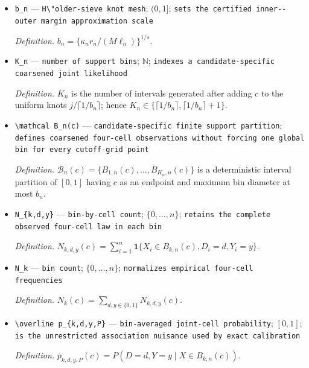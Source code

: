 \documentclass{article}
\begin{document}
\begin{itemize}
  \item \texttt{b\_\allowbreak{}n} --- \texttt{H\textbackslash{}\allowbreak{}"older-\allowbreak{}sieve knot mesh}; \((0,1]\); \texttt{sets the certified inner-\allowbreak{}-\allowbreak{}outer margin approximation scale}
  \par\smallskip\noindent\emph{Definition.} \(b_n=\{\kappa_n r_n/(M\ell_n)\}^{1/s}\).
  \item \texttt{K\_\allowbreak{}n} --- \texttt{number of support bins}; \(\mathbb N\); \texttt{indexes a candidate-\allowbreak{}specific coarsened joint likelihood}
  \par\smallskip\noindent\emph{Definition.} \(K_n\) is the number of intervals generated after adding \(c\) to the uniform knots \(j/\lceil1/b_n\rceil\); hence \(K_n\in\{\lceil1/b_n\rceil,\lceil1/b_n\rceil+1\}\).
  \item \texttt{\textbackslash{}\allowbreak{}mathcal B\_\allowbreak{}n(c)} --- \texttt{candidate-\allowbreak{}specific finite support partition}; \texttt{defines coarsened four-\allowbreak{}cell observations without forcing one global bin for every cutoff-\allowbreak{}grid point}
  \par\smallskip\noindent\emph{Definition.} \(\mathcal B_n(c)=\{B_{1,n}(c),\ldots,B_{K_n,n}(c)\}\) is a deterministic interval partition of \([0,1]\) having \(c\) as an endpoint and maximum bin diameter at most \(b_n\).
  \item \texttt{N\_\allowbreak{}\{k,\allowbreak{}d,\allowbreak{}y\}\allowbreak{}} --- \texttt{bin-\allowbreak{}by-\allowbreak{}cell count}; \(\{0,\ldots,n\}\); \texttt{retains the complete observed four-\allowbreak{}cell law in each bin}
  \par\smallskip\noindent\emph{Definition.} \(N_{k,d,y}(c)=\sum_{i=1}^n\mathbf 1\{X_i\in B_{k,n}(c),D_i=d,Y_i=y\}\).
  \item \texttt{N\_\allowbreak{}k} --- \texttt{bin count}; \(\{0,\ldots,n\}\); \texttt{normalizes empirical four-\allowbreak{}cell frequencies}
  \par\smallskip\noindent\emph{Definition.} \(N_k(c)=\sum_{d,y\in\{0,1\}}N_{k,d,y}(c)\).
  \item \texttt{\textbackslash{}\allowbreak{}overline p\_\allowbreak{}\{k,\allowbreak{}d,\allowbreak{}y,\allowbreak{}P\}\allowbreak{}} --- \texttt{bin-\allowbreak{}averaged joint-\allowbreak{}cell probability}; \([0,1]\); \texttt{is the unrestricted association nuisance used by exact calibration}
  \par\smallskip\noindent\emph{Definition.} \(\overline p_{k,d,y,P}(c)=P(D=d,Y=y\mid X\in B_{k,n}(c))\).

\end{itemize}
\end{document}

